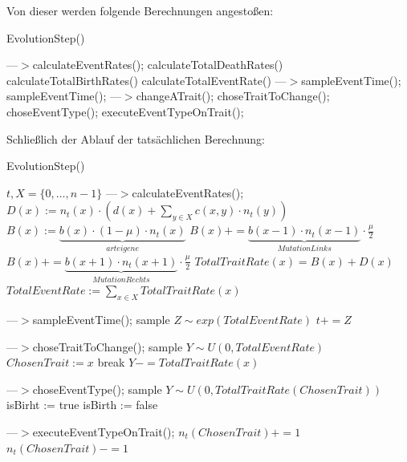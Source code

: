 \documentclass{article}
\begin{document}
	Von dieser werden folgende Berechnungen angestoßen:
		
	\begin{algorithm}[H]
		\caption{EvolutionStep()}
		\begin{algorithmic}[1]
			\STATE ---$>$calculateEventRates();
			\STATE calculateTotalDeathRates()
			\STATE calculateTotalBirthRates()
			\STATE calculateTotalEventRate()
			\STATE ---$>$sampleEventTime();
			\STATE sampleEventTime();
			\STATE ---$>$changeATrait();
			\STATE choseTraitToChange();
			\STATE choseEventType();
			\STATE executeEventTypeOnTrait();
		\end{algorithmic}
	\end{algorithm}
	Schließlich der Ablauf der tatsächlichen Berechnung:
	\begin{algorithm}[H]
		\caption{EvolutionStep()}
		\begin{algorithmic}[1]
			\REQUIRE $ t, X = \{0,\dots, n-1\} $
			\STATE ---$>$calculateEventRates();
				\STATE $  D(x) := n_t(x) \cdot \left( d(x) + \sum_{y \in X} c(x,y) \cdot n_t(y) \right) $
				\STATE $ B(x) := \underbrace{b(x) \cdot (1 - \mu) \cdot n_t(x)}_{arteigene}  $
					\STATE $ B(x) += \underbrace{b(x-1)\cdot n_t(x-1)}_{Mutation Links} \cdot \frac{\mu}{2} $
				\ENDIF
					\STATE $ B(x) += \underbrace{b(x+1)\cdot n_t(x+1)}_{Mutation Rechts} \cdot \frac{\mu}{2} $
				\ENDIF
				\STATE $ TotalTraitRate(x) = B(x) + D(x) $
			\ENDFOR
			\STATE $ TotalEventRate := \sum_{x \in X} TotalTraitRate(x) $
			
			\STATE ---$>$sampleEventTime();
			\STATE sample $ Z \sim exp(TotalEventRate) $
			\STATE $ t += Z $
			
			\STATE ---$>$choseTraitToChange();
			\STATE sample $ Y \sim U(0,TotalEventRate) $
					\STATE $ ChosenTrait := x $
					\STATE break
				\ENDIF
				\STATE $ Y -= TotalTraitRate(x) $
			\ENDFOR
			
			\STATE ---$>$choseEventType();
			\STATE sample $ Y \sim U(0,TotalTraitRate(ChosenTrait)) $
				\STATE isBirht := true
			\ELSE
				\STATE isBirth := false
			\ENDIF
			
			\STATE ---$>$executeEventTypeOnTrait();
				\STATE $ n_t(ChosenTrait) += 1 $
			\ELSE
					\STATE $ n_t(ChosenTrait) -= 1 $
				\ENDIF
			\ENDIF
		\end{algorithmic}
	\end{algorithm}
\end{document}
